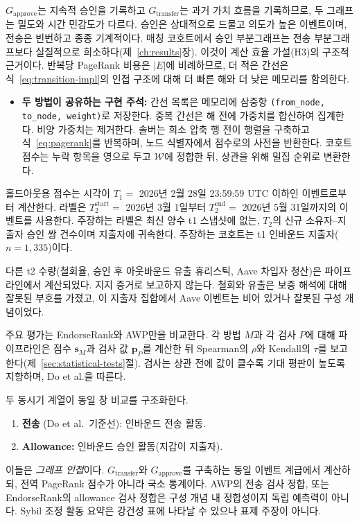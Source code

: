 $G_{\mathrm{approve}}$는 지속적 승인을 기록하고 $G_{\mathrm{transfer}}$는 과거 가치 흐름을 기록하므로, 두 그래프는 밀도와 시간 민감도가 다르다. 승인은 상대적으로 드물고 의도가 높은 이벤트이며, 전송은 빈번하고 종종 기계적이다. 매칭 코호트에서 승인 부분그래프는 전송 부분그래프보다 실질적으로 희소하다(제~\ref{ch:results}장). 이것이 계산 효율 가설(H3)의 구조적 근거이다. 반복당 PageRank 비용은 $|E|$에 비례하므로, 더 적은 간선은 식~\eqref{eq:transition-impl}의 인접 구조에 대해 더 빠른 해와 더 낮은 메모리를 함의한다.

\begin{itemize}
\item \textbf{두 방법이 공유하는 구현 주석:} 간선 목록은 메모리에 삼중항 \texttt{(from\_node, to\_node, weight)}로 저장한다. 중복 간선은 해 전에 가중치를 합산하여 집계한다. 비양 가중치는 제거한다. 솔버는 희소 압축 행 전이 행렬을 구축하고 식~\eqref{eq:pagerank}를 반복하며, 노드 식별자에서 점수로의 사전을 반환한다. 코호트 점수는 누락 항목을 영으로 두고 $\mathcal{W}$에 정합한 뒤, 상관을 위해 밀집 순위로 변환한다.

\end{itemize}


홀드아웃용 점수는 시각이 $T_1=$ 2026년 2월 28일 23:59:59 UTC 이하인 이벤트로부터 계산한다. 라벨은 $T_2^{\mathrm{start}}=$ 2026년 3월 1일부터 $T_2^{\mathrm{end}}=$ 2026년 5월 31일까지의 이벤트를 사용한다. 주장하는 라벨은 최신 양수 t1 스냅샷에 없는, $T_2$의 신규 소유자--지출자 승인 쌍 건수이며 지출자에 귀속한다. 주장하는 코호트는 t1 인바운드 지출자($n=1{,}335$)이다.

다른 t2 수량(철회율, 승인 후 아웃바운드 유출 휴리스틱, Aave 차입자 청산)은 파이프라인에서 계산되었다. 지지 증거로 보고하지 않는다. 철회와 유출은 보증 해석에 대해 잘못된 부호를 가졌고, 이 지출자 집합에서 Aave 이벤트는 비어 있거나 잘못된 구성 개념이었다.


주요 평가는 EndorseRank와 AWP만을 비교한다. 각 방법 $M$과 각 검사 $P$에 대해 파이프라인은 점수 $\mathbf{s}_M$과 검사 값 $\mathbf{p}_P$를 계산한 뒤 Spearman의 $\rho$와 Kendall의 $\tau$를 보고한다(제~\ref{sec:statistical-tests}절). 검사는 상관 전에 값이 클수록 기대 평판이 높도록 지향하며, Do et al.을 따른다.

두 동시기 계열이 동일 창 비교를 구조화한다.
\begin{enumerate}
\item \textbf{전송} (Do et al.\ 기준선): 인바운드 전송 활동.
\item \textbf{Allowance:} 인바운드 승인 활동(지갑이 지출자).
\end{enumerate}
이들은 \emph{그래프 인접}이다. $G_{\mathrm{transfer}}$와 $G_{\mathrm{approve}}$를 구축하는 동일 이벤트 계급에서 계산하되, 전역 PageRank 점수가 아니라 국소 통계이다. AWP의 전송 검사 정합, 또는 EndorseRank의 allowance 검사 정합은 구성 개념 내 정합성이지 독립 예측력이 아니다. Sybil 조정 활동 요약은 강건성 표에 나타날 수 있으나 표제 주장이 아니다.

